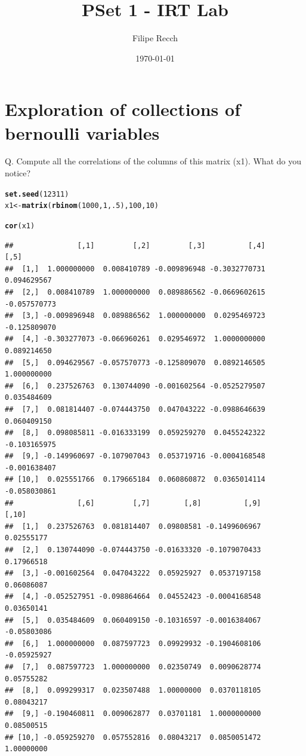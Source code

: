\documentclass[letterpaper,12pt]{article}\usepackage[]{graphicx}\usepackage[]{color}
\title{PSet 1 - IRT Lab}
\author{Filipe Recch}
\date{\today}
\makeatletter
\newcommand{\hlnum}[1]{\textcolor[rgb]{0.686,0.059,0.569}{#1}}%
\newcommand{\hlstd}[1]{\textcolor[rgb]{0.345,0.345,0.345}{#1}}%
\newcommand{\hlkwb}[1]{\textcolor[rgb]{0.69,0.353,0.396}{#1}}%
\newcommand{\hlkwd}[1]{\textcolor[rgb]{0.737,0.353,0.396}{\textbf{#1}}}%
\newenvironment{kframe}{%
 \def\at@end@of@kframe{}%
 \ifinner\ifhmode%
  \def\at@end@of@kframe{\end{minipage}}%
  \begin{minipage}{\columnwidth}%
 \fi\fi%
 \def\FrameCommand##1{\hskip\@totalleftmargin \hskip-\fboxsep
 \colorbox{shadecolor}{##1}\hskip-\fboxsep
     \hskip-\linewidth \hskip-\@totalleftmargin \hskip\columnwidth}%
 \MakeFramed {\advance\hsize-\width
   \@totalleftmargin\z@ \linewidth\hsize
   \@setminipage}}%
 {\par\unskip\endMakeFramed%
 \at@end@of@kframe}
\newenvironment{knitrout}{}{} %
\numberwithin{equation}{section}
\makeatother
\begin{document}
\maketitle



\section{Exploration of collections of bernoulli variables}

Q. Compute all the correlations of the columns of this matrix (x1). What do you notice?

\begin{knitrout}
\color{fgcolor}\begin{kframe}
\begin{alltt}
\hlkwd{set.seed}\hlstd{(}\hlnum{12311}\hlstd{)}
\hlstd{x1}\hlkwb{<-}\hlkwd{matrix}\hlstd{(}\hlkwd{rbinom}\hlstd{(}\hlnum{1000}\hlstd{,}\hlnum{1}\hlstd{,}\hlnum{.5}\hlstd{),}\hlnum{100}\hlstd{,}\hlnum{10}\hlstd{)}

\hlkwd{cor}\hlstd{(x1)}
\end{alltt}
\begin{verbatim}
##               [,1]         [,2]         [,3]          [,4]         [,5]
##  [1,]  1.000000000  0.008410789 -0.009896948 -0.3032770731  0.094629567
##  [2,]  0.008410789  1.000000000  0.089886562 -0.0669602615 -0.057570773
##  [3,] -0.009896948  0.089886562  1.000000000  0.0295469723 -0.125809070
##  [4,] -0.303277073 -0.066960261  0.029546972  1.0000000000  0.089214650
##  [5,]  0.094629567 -0.057570773 -0.125809070  0.0892146505  1.000000000
##  [6,]  0.237526763  0.130744090 -0.001602564 -0.0525279507  0.035484609
##  [7,]  0.081814407 -0.074443750  0.047043222 -0.0988646639  0.060409150
##  [8,]  0.098085811 -0.016333199  0.059259270  0.0455242322 -0.103165975
##  [9,] -0.149960697 -0.107907043  0.053719716 -0.0004168548 -0.001638407
## [10,]  0.025551766  0.179665184  0.060860872  0.0365014114 -0.058030861
##               [,6]         [,7]        [,8]          [,9]       [,10]
##  [1,]  0.237526763  0.081814407  0.09808581 -0.1499606967  0.02555177
##  [2,]  0.130744090 -0.074443750 -0.01633320 -0.1079070433  0.17966518
##  [3,] -0.001602564  0.047043222  0.05925927  0.0537197158  0.06086087
##  [4,] -0.052527951 -0.098864664  0.04552423 -0.0004168548  0.03650141
##  [5,]  0.035484609  0.060409150 -0.10316597 -0.0016384067 -0.05803086
##  [6,]  1.000000000  0.087597723  0.09929932 -0.1904608106 -0.05925927
##  [7,]  0.087597723  1.000000000  0.02350749  0.0090628774  0.05755282
##  [8,]  0.099299317  0.023507488  1.00000000  0.0370118105  0.08043217
##  [9,] -0.190460811  0.009062877  0.03701181  1.0000000000  0.08500515
## [10,] -0.059259270  0.057552816  0.08043217  0.0850051472  1.00000000
\end{verbatim}
\end{kframe}
\end{knitrout}
\end{document}
